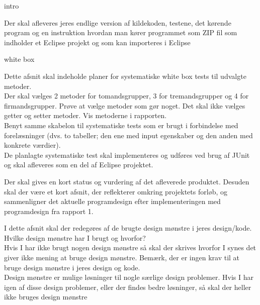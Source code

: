 intro
\begin{mdframed}[backgroundcolor=black!5]
Der skal afleveres jeres endlige version af kildekoden, testene, det kørende program og en instruktion hvordan man kører programmet som ZIP fil som indholder et Eclipse projekt og som kan importeres i Eclipse
\end{mdframed}

white box
\begin{mdframed}[backgroundcolor=black!5]
Dette afsnit skal indeholde planer for systematiske
white box tests til udvalgte metoder. \\

Der skal vælges 2 metoder for tomandsgrupper, 3 for tremandsgrupper og 4 for firmandsgrupper. Prøve at vælge metoder som gør noget. Det skal ikke vælges getter og setter metoder. Vis metoderne i rapporten. \\

Benyt samme skabelon til systematiske tests som er brugt i forbindelse med forelæsninger (dvs. to tabeller; den ene med input egenskaber og den anden med konkrete værdier). \\

De planlagte systematiske test skal implementeres og udføres ved brug af JUnit og skal afleveres som en del af Eclipse projektet.
\end{mdframed}

\begin{mdframed}[backgroundcolor=black!5]
 Der skal gives en kort status og vurdering af det afleverede produktet.
Desuden skal der være et kort afsnit, der reflekterer omkring projektets forløb, og
sammenligner det aktuelle programdesign efter implementeringen med programdesign
fra rapport 1.
 \end{mdframed}
 
 \begin{mdframed}[backgroundcolor=black!5]
I dette afsnit skal der redegøres af de brugte design mønstre i jeres design/kode. Hvilke design mønstre har I brugt og hvorfor?  \\
 
 Hvis I har ikke brugt nogen
design mønstre så skal der skrives hvorfor I synes det giver ikke mening at bruge design mønstre. Bemærk, der er ingen krav til at bruge design mønstre i jeres design og kode.\\

Design mønstre er mulige løsninger til nogle særlige design problemer. Hvis I har igen af disse design problemer, eller der findes bedre løsninger, så skal der heller ikke bruges
design mønstre
\end{mdframed}